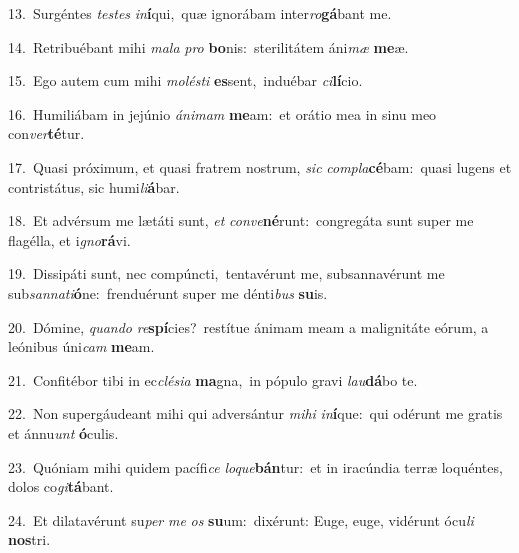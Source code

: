 {\numbfont\textcolor{\numbcolor}{13.}}~Surgéntes \textit{tes}\-\textit{tes} \textit{in}\-\textbf{í}qui,~\star quæ ignorábam inter\-\textit{ro}\-\textbf{gá}bant me.\par
{\numbfont\textcolor{\numbcolor}{14.}}~Retribuébant mihi \textit{ma}\-\textit{la} \textit{pro} \textbf{bo}\-nis:~\star sterilitátem áni\textit{mæ} \textbf{me}\-æ.\par
{\numbfont\textcolor{\numbcolor}{15.}}~Ego autem cum mihi \textit{mo}\-\textit{lés}\textit{ti} \textbf{es}\-sent,~\star induébar \textit{ci}\-\textbf{lí}cio.\par
{\numbfont\textcolor{\numbcolor}{16.}}~Humiliábam in jejúnio \textit{á}\-\textit{ni}\textit{mam} \textbf{me}\-am:~\star et orátio mea in sinu meo con\-\textit{ver}\-\textbf{té}tur.\par
{\numbfont\textcolor{\numbcolor}{17.}}~Quasi próximum, et quasi fratrem nostrum, \textit{sic} \textit{com}\-\textit{pla}\textbf{cé}bam:~\star quasi lugens et contristátus, sic humi\-\textit{li}\-\textbf{á}bar.\par
{\numbfont\textcolor{\numbcolor}{18.}}~Et advérsum me lætáti sunt, \textit{et} \textit{con}\-\textit{ve}\textbf{né}runt:~\star congregáta sunt super me flagélla, et i\-\textit{gno}\-\textbf{rá}vi.\par
{\numbfont\textcolor{\numbcolor}{19.}}~Dissipáti sunt, nec compúncti,~\dagger tentavérunt me, subsannavérunt me sub\-\textit{san}\-\textit{na}\textit{ti}\textbf{ó}ne:~\star frenduérunt super me dénti\textit{bus} \textbf{su}\-is.\par
{\numbfont\textcolor{\numbcolor}{20.}}~Dómine, \textit{quan}\-\textit{do} \textit{re}\-\textbf{spí}cies?~\star restítue ánimam meam a malignitáte eórum, a leónibus úni\textit{cam} \textbf{me}\-am.\par
{\numbfont\textcolor{\numbcolor}{21.}}~Confitébor tibi in ec\-\textit{clé}\-\textit{si}\textit{a} \textbf{ma}\-gna,~\star in pópulo gravi \textit{lau}\-\textbf{dá}bo te.\par
{\numbfont\textcolor{\numbcolor}{22.}}~Non supergáudeant mihi qui adversántur \textit{mi}\-\textit{hi} \textit{in}\-\textbf{í}que:~\star qui odérunt me gratis et ánnu\textit{unt} \textbf{ó}\-culis.\par
{\numbfont\textcolor{\numbcolor}{23.}}~Quóniam mihi quidem pacífi\textit{ce} \textit{lo}\-\textit{que}\textbf{bán}tur:~\star et in iracúndia terræ loquéntes, dolos co\-\textit{gi}\-\textbf{tá}bant.\par
{\numbfont\textcolor{\numbcolor}{24.}}~Et dilatavérunt su\textit{per} \textit{me} \textit{os} \textbf{su}\-um:~\star dixérunt: Euge, euge, vidérunt ócu\textit{li} \textbf{nos}\-tri.\par

